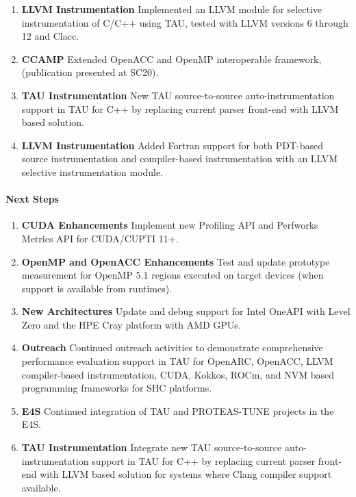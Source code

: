 \begin{enumerate}
\item \textbf{LLVM Instrumentation} Implemented an LLVM module for selective instrumentation of C/C++ using TAU, tested with LLVM versions 6 through 12 and Clacc.

\item \textbf{CCAMP} Extended OpenACC and OpenMP interoperable framework, (publication presented at SC20).

\item \textbf{TAU Instrumentation} New TAU source-to-source auto-instrumentation support in TAU for C++ by replacing current parser front-end with LLVM based solution.

\item \textbf{LLVM Instrumentation} Added Fortran support for both PDT-based source instrumentation and compiler-based instrumentation with an LLVM selective instrumentation module.

\end{enumerate}

\paragraph{Next Steps}
\begin{enumerate}
\item \textbf{CUDA Enhancements}
Implement new Profiling API and Perfworks Metrics API for CUDA/CUPTI 11+.

\item \textbf{OpenMP and OpenACC Enhancements}
Test and update prototype measurement for OpenMP 5.1 regions executed on target devices (when support is available from runtimes).

\item \textbf{New Architectures}
Update and debug support for Intel OneAPI with Level Zero and the HPE Cray platform with AMD GPUs.

\item \textbf{Outreach}
Continued outreach activities to demonstrate comprehensive performance evaluation support in TAU for OpenARC, OpenACC, LLVM compiler-based instrumentation, CUDA, Kokkos, ROCm, and NVM based programming frameworks for SHC platforms.

\item \textbf{E4S}
Continued integration of TAU and PROTEAS-TUNE projects in the E4S.

\item \textbf{TAU Instrumentation} Integrate new TAU source-to-source auto-instrumentation support in TAU for C++ by replacing current parser front-end with LLVM based solution for systems where Clang compiler support available.

\end{enumerate}
